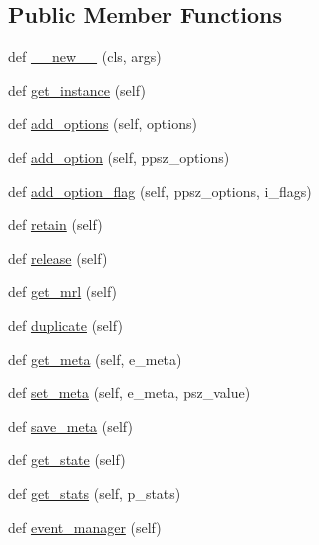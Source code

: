 \subsection*{Public Member Functions}
\begin{DoxyCompactItemize}
\item 
def \hyperlink{classsrc_1_1lib_1_1vlc_1_1Media_a142ae131a221b149de9bc798e9f076f4}{\+\_\+\+\_\+new\+\_\+\+\_\+} (cls, args)
\item 
def \hyperlink{classsrc_1_1lib_1_1vlc_1_1Media_a58142c2e19903edf38de826f6a14d79f}{get\+\_\+instance} (self)
\item 
def \hyperlink{classsrc_1_1lib_1_1vlc_1_1Media_ac3be24ef6e3783406704eb9e6bb8287c}{add\+\_\+options} (self, options)
\item 
def \hyperlink{classsrc_1_1lib_1_1vlc_1_1Media_abad84c4add2b05c53b9fde0a3770c7a7}{add\+\_\+option} (self, ppsz\+\_\+options)
\item 
def \hyperlink{classsrc_1_1lib_1_1vlc_1_1Media_a8af73e42911c4edc74b83a8349b0f08c}{add\+\_\+option\+\_\+flag} (self, ppsz\+\_\+options, i\+\_\+flags)
\item 
def \hyperlink{classsrc_1_1lib_1_1vlc_1_1Media_af418767f78d273f3a6333bc6409acbf0}{retain} (self)
\item 
def \hyperlink{classsrc_1_1lib_1_1vlc_1_1Media_a78f84facb442b8436626de8ccd30dba2}{release} (self)
\item 
def \hyperlink{classsrc_1_1lib_1_1vlc_1_1Media_a8c01cb6f3b79528190988f77fd2b12f8}{get\+\_\+mrl} (self)
\item 
def \hyperlink{classsrc_1_1lib_1_1vlc_1_1Media_ab46200b100bfcf138bc94026b34c78ec}{duplicate} (self)
\item 
def \hyperlink{classsrc_1_1lib_1_1vlc_1_1Media_a4ee1be5ada95e0f32552c7898b458092}{get\+\_\+meta} (self, e\+\_\+meta)
\item 
def \hyperlink{classsrc_1_1lib_1_1vlc_1_1Media_a97554b26343f00f1a35dd6ecc3caf58b}{set\+\_\+meta} (self, e\+\_\+meta, psz\+\_\+value)
\item 
def \hyperlink{classsrc_1_1lib_1_1vlc_1_1Media_aeee361ad7cfab38a3172608a4e475e87}{save\+\_\+meta} (self)
\item 
def \hyperlink{classsrc_1_1lib_1_1vlc_1_1Media_a168ad642702032fee2c3bdf7d2e6f5db}{get\+\_\+state} (self)
\item 
def \hyperlink{classsrc_1_1lib_1_1vlc_1_1Media_add9ecc3f5b46a2bf7392edcadbb7d62e}{get\+\_\+stats} (self, p\+\_\+stats)
\item 
def \hyperlink{classsrc_1_1lib_1_1vlc_1_1Media_aa93f27f97389c5c29780b19b36b16fd0}{event\+\_\+manager} (self)

\end{DoxyCompactItemize}
